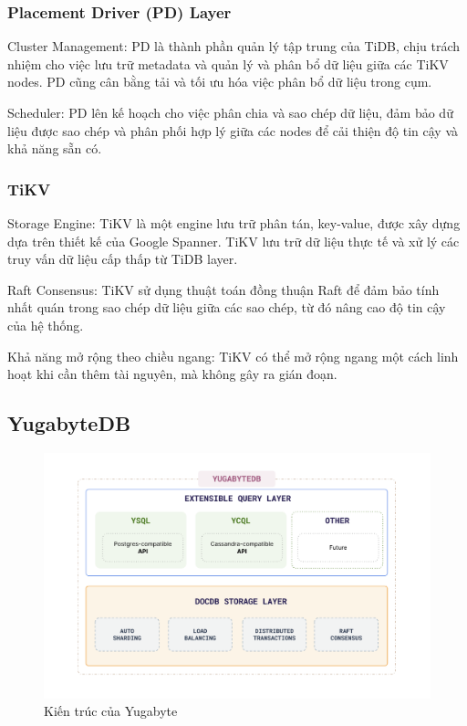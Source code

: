 \documentclass[50pt]{extarticle}
\begin{document}
\subsubsection{Placement Driver (PD) Layer}

Cluster Management: PD là thành phần quản lý tập trung của TiDB, chịu trách nhiệm cho việc lưu trữ metadata và quản lý và phân bổ dữ liệu giữa các TiKV nodes. PD cũng cân bằng tải và tối ưu hóa việc phân bổ dữ liệu trong cụm.

Scheduler: PD lên kế hoạch cho việc phân chia và sao chép dữ liệu, đảm bảo dữ liệu được sao chép và phân phối hợp lý giữa các nodes để cải thiện độ tin cậy và khả năng sẵn có.


\subsubsection{TiKV}

Storage Engine: TiKV là một engine lưu trữ phân tán, key-value, được xây dựng dựa trên thiết kế của Google Spanner. TiKV lưu trữ dữ liệu thực tế và xử lý các truy vấn dữ liệu cấp thấp từ TiDB layer.

Raft Consensus: TiKV sử dụng thuật toán đồng thuận Raft để đảm bảo tính nhất quán trong sao chép dữ liệu giữa các sao chép, từ đó nâng cao độ tin cậy của hệ thống.

Khả năng mở rộng theo chiều ngang: TiKV có thể mở rộng ngang một cách linh hoạt khi cần thêm tài nguyên, mà không gây ra gián đoạn.

\subsection{YugabyteDB}

\begin{figure}
    \centering
    \includegraphics[width=0.8\linewidth]{images/YugaArchitecture.png}
    \caption{Kiến trúc của Yugabyte \protect\footnotemark}
    \label{fig:YugaArchitecture}
\end{figure}
\end{document}
